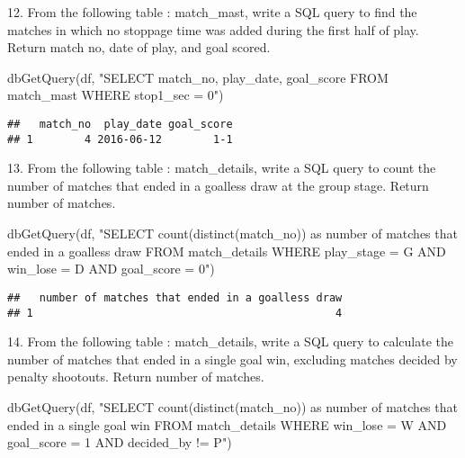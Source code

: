 \documentclass[
]{article}
\newenvironment{Shaded}{\begin{snugshade}}{\end{snugshade}}
\newcommand{\FunctionTok}[1]{\textcolor[rgb]{0.00,0.00,0.00}{#1}}
\newcommand{\NormalTok}[1]{#1}
\newcommand{\StringTok}[1]{\textcolor[rgb]{0.31,0.60,0.02}{#1}}
\begin{document}
12. From the following table : match\_mast, write a SQL query to find
the matches in which no stoppage time was added during the first half of
play. Return match no, date of play, and goal scored.

\begin{Shaded}
\begin{Highlighting}[]
\FunctionTok{dbGetQuery}\NormalTok{(df, }\StringTok{"SELECT match\_no,}
\StringTok{                       play\_date,}
\StringTok{                       goal\_score}
\StringTok{                FROM match\_mast}
\StringTok{                WHERE stop1\_sec = 0"}\NormalTok{)}
\end{Highlighting}
\end{Shaded}

\begin{verbatim}
##   match_no  play_date goal_score
## 1        4 2016-06-12        1-1
\end{verbatim}

13. From the following table : match\_details, write a SQL query to
count the number of matches that ended in a goalless draw at the group
stage. Return number of matches.

\begin{Shaded}
\begin{Highlighting}[]
\FunctionTok{dbGetQuery}\NormalTok{(df, }\StringTok{"SELECT count(distinct(match\_no)) as \textquotesingle{}number of matches that ended in a goalless draw\textquotesingle{} }
\StringTok{                FROM match\_details}
\StringTok{                WHERE play\_stage = \textquotesingle{}G\textquotesingle{} AND win\_lose = \textquotesingle{}D\textquotesingle{} AND goal\_score = 0"}\NormalTok{)}
\end{Highlighting}
\end{Shaded}

\begin{verbatim}
##   number of matches that ended in a goalless draw
## 1                                               4
\end{verbatim}

14. From the following table : match\_details, write a SQL query to
calculate the number of matches that ended in a single goal win,
excluding matches decided by penalty shootouts. Return number of
matches.

\begin{Shaded}
\begin{Highlighting}[]
\FunctionTok{dbGetQuery}\NormalTok{(df, }\StringTok{"SELECT count(distinct(match\_no)) as \textquotesingle{}number of matches that ended in a single goal win\textquotesingle{} }
\StringTok{                FROM match\_details}
\StringTok{                WHERE win\_lose = \textquotesingle{}W\textquotesingle{} AND goal\_score = 1 AND decided\_by != \textquotesingle{}P\textquotesingle{}"}\NormalTok{)}
\end{Highlighting}
\end{Shaded}
\end{document}
